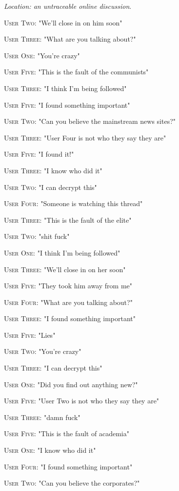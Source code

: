 \documentclass{report}
\begin{document}
\textit{Location: an untraceable online discussion}. 

\textsc{User Two}: "We'll close in on him soon" 

\textsc{User Three}: "What are you talking about?" 

\textsc{User One}: "You're crazy" 

\textsc{User Five}: "This is the fault of the communists" 

\textsc{User Three}: "I think I'm being followed" 

\textsc{User Five}: "I found something important" 

\textsc{User Two}: "Can you believe the mainstream news sites?" 

\textsc{User Three}: "User Four is not who they say they are" 

\textsc{User Five}: "I found it!" 

\textsc{User Three}: "I know who did it" 

\textsc{User Two}: "I can decrypt this" 

\textsc{User Four}: "Someone is watching this thread" 

\textsc{User Three}: "This is the fault of the elite" 

\textsc{User Two}: "shit fuck" 

\textsc{User One}: "I think I'm being followed" 

\textsc{User Three}: "We'll close in on her soon" 

\textsc{User Five}: "They took him away from me" 

\textsc{User Four}: "What are you talking about?" 

\textsc{User Three}: "I found something important" 

\textsc{User Five}: "Lies" 

\textsc{User Two}: "You're crazy" 

\textsc{User Three}: "I can decrypt this" 

\textsc{User One}: "Did you find out anything new?" 

\textsc{User Five}: "User Two is not who they say they are" 

\textsc{User Three}: "damn fuck" 

\textsc{User Five}: "This is the fault of academia" 

\textsc{User One}: "I know who did it" 

\textsc{User Four}: "I found something important" 

\textsc{User Two}: "Can you believe the corporates?" 
\end{document}
